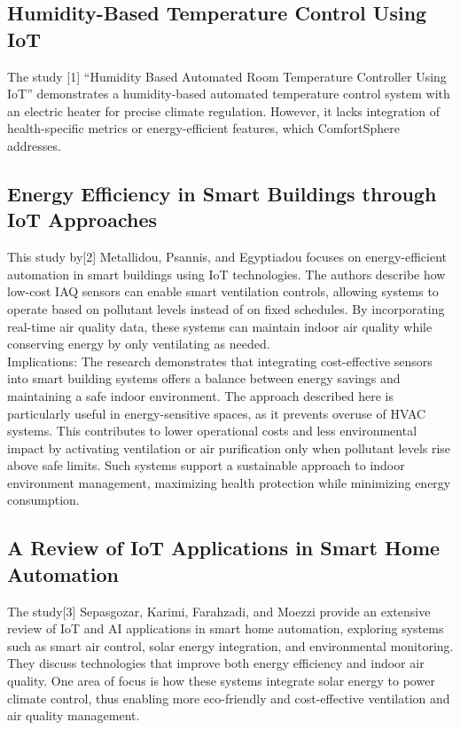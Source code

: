 \documentclass[a4paper]{scrartcl}
\begin{document}
\subsection{Humidity-Based Temperature Control Using IoT}
The study [1] “Humidity Based Automated Room Temperature Controller Using IoT” demonstrates a humidity-based automated temperature control system with an electric heater for precise climate regulation. However, it lacks integration of health-specific metrics or energy-efficient features, which ComfortSphere addresses.

\subsection{Energy Efficiency in Smart Buildings through IoT Approaches}
This study by[2] Metallidou, Psannis, and Egyptiadou focuses on energy-efficient automation in smart buildings using IoT technologies. The authors describe how low-cost IAQ sensors can enable smart ventilation controls, allowing systems to operate based on pollutant levels instead of on fixed schedules. By incorporating real-time air quality data, these systems can maintain indoor air quality while conserving energy by only ventilating as needed.\\

Implications:
The research demonstrates that integrating cost-effective sensors into smart building systems offers a balance between energy savings and maintaining a safe indoor environment. The approach described here is particularly useful in energy-sensitive spaces, as it prevents overuse of HVAC systems. This contributes to lower operational costs and less environmental impact by activating ventilation or air purification only when pollutant levels rise above safe limits. Such systems support a sustainable approach to indoor environment management, maximizing health protection while minimizing energy consumption.

\subsection{A Review of IoT Applications in Smart Home Automation}
The study[3] Sepasgozar, Karimi, Farahzadi, and Moezzi provide an extensive review of IoT and AI applications in smart home automation, exploring systems such as smart air control, solar energy integration, and environmental monitoring. They discuss technologies that improve both energy efficiency and indoor air quality. One area of focus is how these systems integrate solar energy to power climate control, thus enabling more eco-friendly and cost-effective ventilation and air quality management.\\
\end{document}
